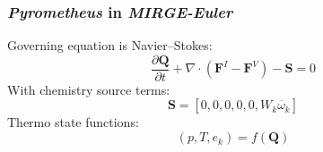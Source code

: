 

\begin{frame}\frametitle{\textit{Pyrometheus} in \textit{MIRGE-Euler}}
  \begin{multicols}{2}
    Governing equation is Navier--Stokes:
    \begin{equation*}
      \frac{\partial\mathbf{Q}}{\partial{t}} + \nabla \cdot (\mathbf{F}^I - \mathbf{F}^V) - \mathbf{S} = 0
    \end{equation*}
    With chemistry source terms:
    \begin{equation*}
      \mathbf{S} = [ 0, 0, 0, 0, 0, W_k\dot{\omega_k} ]
    \end{equation*}
    Thermo state functions:
    \begin{equation*}
      (p, T, e_k) = f(\mathbf{Q})
    \end{equation*}
    \begin{center}
    \end{center}
    \columnbreak
  \end{multicols}
\end{frame}

